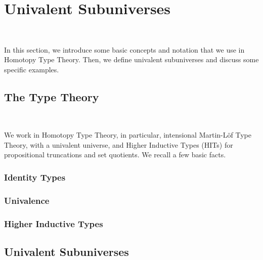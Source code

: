 \section{Univalent Subuniverses}~\label{sec:univalent}

In this section, we introduce some basic concepts and notation that we use in
Homotopy Type Theory. Then, we define univalent subuniverses and discuss some
specific examples.

\subsection{The Type Theory}~\label{subsec:type-theory}

We work in Homotopy Type Theory, in particular, intensional Martin-L\"{o}f Type
Theory, with a univalent universe, and Higher Inductive Types (HITs) for
propositional truncations and set quotients. We recall a few basic facts.

\subsubsection{Identity Types}

\subsubsection{Univalence}

\subsubsection{Higher Inductive Types}

\subsection{Univalent Subuniverses}



